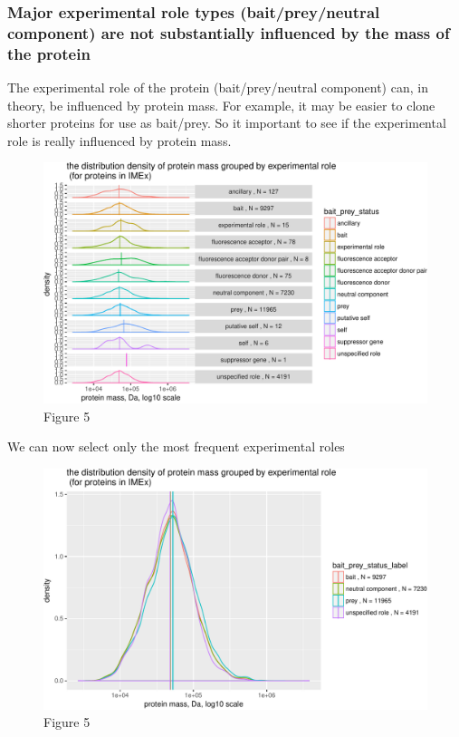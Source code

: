 \documentclass[]{article}
\begin{document}
\subsubsection{Major experimental role types (bait/prey/neutral
component) are not substantially influenced by the mass of the
protein}\label{major-experimental-role-types-baitpreyneutral-component-are-not-substantially-influenced-by-the-mass-of-the-protein}

The experimental role of the protein (bait/prey/neutral component) can,
in theory, be influenced by protein mass. For example, it may be easier
to clone shorter proteins for use as bait/prey. So it important to see
if the experimental role is really influenced by protein mass.

\begin{figure}[htbp]
\centering
\includegraphics{final_report_files/figure-latex/human_not_in_IMEx_bait_vs_non_bait-1.pdf}
\caption{Figure 5}
\end{figure}

We can now select only the most frequent experimental roles

\begin{figure}[htbp]
\centering
\includegraphics{final_report_files/figure-latex/human_not_in_IMEx_bait_vs_non_bait2-1.pdf}
\caption{Figure 5}
\end{figure}
\end{document}
